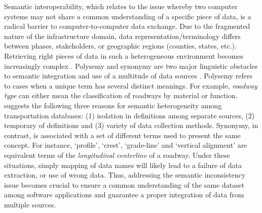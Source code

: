 \documentclass[Journal, BackFigs,NoLists, DoubleSpace]{ascelike}%
\begin{document}
Semantic interoperability, which relates to the issue whereby two computer systems may not share a common understanding of a specific piece of data, is a radical barrier to computer-to-computer data exchange. Due to the fragmented nature of the infrastructure domain, data representation/terminology differs between phases, stakeholders, or geographic regions (counties, states, etc.). Retrieving right pieces of data in such a heterogeneous environment becomes increasingly complex \cite{karimi2003semantic}. Polysemy and synonymy are two major linguistic obstacles to semantic integration and use of a multitude of data sources \cite{noy04}. Polysemy refers to cases when a unique term has several distinct meanings. For example, \textit{roadway type} can either mean the classification of roadways by material or function.  suggests the following three reasons for semantic heterogeneity among transportation databases: (1) isolation in definitions among separate sources, (2) temporary of definitions and (3) variety of data collection methods. Synonymy, in contrast, is associated with a set of different terms used to present the same concept. For instance, `profile', `crest', `grade-line' and `vertical alignment' are equivalent terms of the \textit{longitudinal centerline} of a roadway. Under these situations, simply mapping of data names will likely lead to a failure of data extraction, or use of wrong data. Thus, addressing the semantic inconsistency issue becomes crucial to ensure a common understanding of the same dataset among software applications and guarantee a proper integration of data from multiple sources. 
\par
\end{document}
